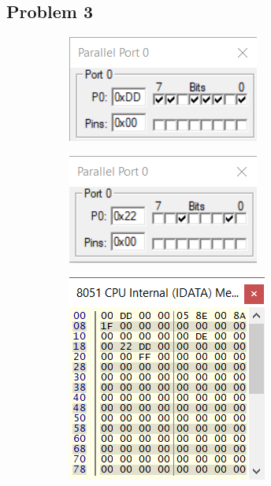 \documentclass{lab_sheet}
\begin{document}
\subsection*{Problem 3}
\begin{figure}[H]
\begin{subfigure}{.5\textwidth}
  \centering
  \includegraphics[frame,width=.8\linewidth]{../Figures/1_3_a.png}  
  \label{fig:prob3-a}
  \caption{}
\end{subfigure}
\begin{subfigure}{.5\textwidth}
  \centering
  \includegraphics[frame,width=.8\linewidth]{../Figures/1_3_b.png}  
  \label{fig:prob3-b}
  \caption{}
\end{subfigure}
\newline
\hspace*{\fill}
\begin{subfigure}{.5\textwidth}
  \centering
  \includegraphics[frame,width=.8\linewidth]{../Figures/1_3_c.png}   

\end{subfigure}
\end{figure}
\end{document}
